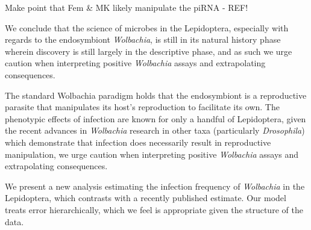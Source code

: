 \documentclass[12pt]{article}
\begin{document}
\citet{vanNieukerken:2011a123}

\citet{Jiggins:2001p7754}

\citet{Jiggins:2001uo}


Make point that Fem \& MK likely manipulate the piRNA - REF!

We conclude that the science of microbes in the Lepidoptera, especially with regards to the endosymbiont \textit{Wolbachia}, is still in its natural history phase wherein discovery is still largely in the descriptive phase, and as such we urge caution when interpreting positive \textit{Wolbachia} assays and extrapolating consequences. 

The standard Wolbachia paradigm holds that the endosymbiont is a reproductive parasite that manipulates its host’s reproduction to facilitate its own. The phenotypic effects of infection are known for only a handful of Lepidoptera, given the recent advances in \textit{Wolbachia} research in other taxa (particularly \textit{Drosophila}) which demonstrate that infection does necessarily result in reproductive manipulation, we urge caution when interpreting positive \textit{Wolbachia} assays and extrapolating consequences.

We present a new analysis estimating the infection frequency of \textit{Wolbachia} in the Lepidoptera, which contrasts with a recently published estimate. Our model treats error hierarchically, which we feel is appropriate given the structure of the data. 




 
\end{document}
